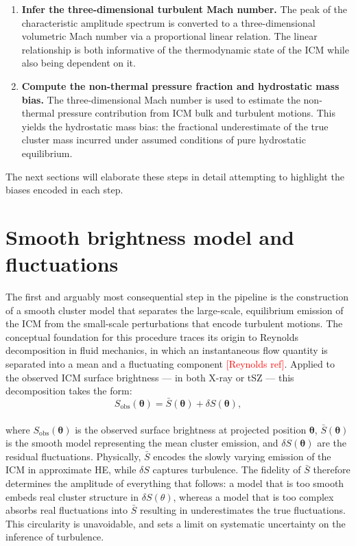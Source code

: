 \begin{enumerate}
	\item \textbf{Infer the three-dimensional turbulent Mach number.} The peak of the characteristic amplitude spectrum is converted to a three-dimensional volumetric Mach number via a proportional linear relation. The linear relationship is both informative of the thermodynamic state of the ICM while also being dependent on it.
	
	\item \textbf{Compute the non-thermal pressure fraction and hydrostatic mass bias.} The three-dimensional Mach number is used to estimate the non-thermal pressure contribution from ICM bulk and turbulent motions. This yields the hydrostatic mass bias: the fractional underestimate of the true cluster mass incurred under assumed conditions of pure hydrostatic equilibrium.
	
\end{enumerate}
 
The next sections will elaborate these steps in detail attempting to highlight the biases encoded in each step.
\clearpage
\section{Smooth brightness model and fluctuations}
\label{Chap:assumptionSmoothSBModel}

The first and arguably most consequential step in the pipeline is the construction of a smooth cluster model that separates the large-scale, equilibrium emission of the ICM from the small-scale perturbations that encode turbulent motions. The conceptual foundation for this procedure traces its origin to Reynolds decomposition in fluid mechanics, in which an instantaneous flow quantity is separated into a mean and a fluctuating component \textcolor{red}{[Reynolds ref]}. Applied to the observed ICM surface brightness --- in both X-ray or tSZ --- this decomposition takes the form:
%
\begin{equation}
	S_{\mathrm{obs}}(\boldsymbol{\theta}) = 
	\bar{S}(\boldsymbol{\theta}) + \delta S(\boldsymbol{\theta}),
	\label{eq:Reynolds}
\end{equation}
\\
where $S_{\mathrm{obs}}(\boldsymbol{\theta})$ is the observed surface brightness at projected position $\boldsymbol{\theta}$, $\bar{S}(\boldsymbol{\theta})$ is the smooth model representing the mean cluster emission, and $\delta S(\boldsymbol{\theta})$ are the residual fluctuations. Physically, $\bar{S}$ encodes the slowly varying emission of the ICM in approximate HE, while $\delta S$ captures turbulence. The fidelity of $\bar{S}$ therefore determines the amplitude of everything that follows: a model that is too smooth embeds real cluster structure in $\delta{S}(\theta)$, whereas a model that is too complex absorbs real fluctuations into $\bar{S}$ resulting in underestimates the true fluctuations. This circularity is unavoidable, and sets a limit on systematic uncertainty on the inference of turbulence.

